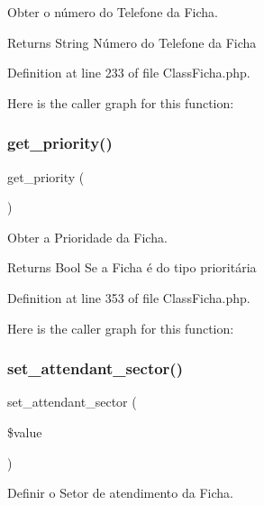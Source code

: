 Obter o número do Telefone da Ficha. 

\begin{DoxyReturn}{Returns}
String Número do Telefone da Ficha 
\end{DoxyReturn}


Definition at line 233 of file Class\+Ficha.\+php.

Here is the caller graph for this function\+:
\mbox{\label{class_class_ficha_a806364a3a299a2b99db62a4393c92855}} 
\subsubsection{\texorpdfstring{get\+\_\+priority()}{get\_priority()}}
{\footnotesize\ttfamily get\+\_\+priority (\begin{DoxyParamCaption}{ }\end{DoxyParamCaption})}



Obter a Prioridade da Ficha. 

\begin{DoxyReturn}{Returns}
Bool Se a Ficha é do tipo prioritária 
\end{DoxyReturn}


Definition at line 353 of file Class\+Ficha.\+php.

Here is the caller graph for this function\+:
\mbox{\label{class_class_ficha_ab2f464eda89675298cebd70c29a5fe63}} 
\subsubsection{\texorpdfstring{set\+\_\+attendant\+\_\+sector()}{set\_attendant\_sector()}}
{\footnotesize\ttfamily set\+\_\+attendant\+\_\+sector (\begin{DoxyParamCaption}\item[{}]{\$value }\end{DoxyParamCaption})}



Definir o Setor de atendimento da Ficha. 


